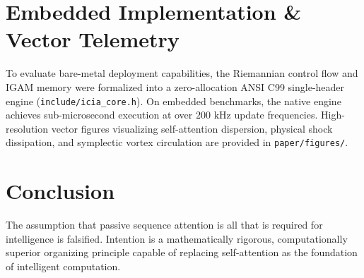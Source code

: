 \documentclass[10pt,twocolumn,letterpaper]{article}
\theoremstyle{plain}
\theoremstyle{definition}
\begin{document}
\section{Embedded Implementation \& Vector Telemetry}
To evaluate bare-metal deployment capabilities, the Riemannian control flow and IGAM memory were formalized into a zero-allocation ANSI C99 single-header engine (\texttt{include/icia\_core.h}). On embedded benchmarks, the native engine achieves sub-microsecond execution at over $200\text{ kHz}$ update frequencies. High-resolution vector figures visualizing self-attention dispersion, physical shock dissipation, and symplectic vortex circulation are provided in \texttt{paper/figures/}.

\section{Conclusion}
The assumption that passive sequence attention is all that is required for intelligence is falsified. Intention is a mathematically rigorous, computationally superior organizing principle capable of replacing self-attention as the foundation of intelligent computation.



\end{document}
